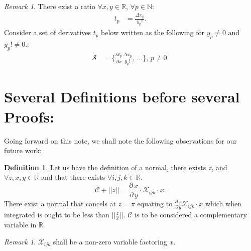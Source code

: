 \documentclass[10pt]{article}
\theoremstyle{plain}
\theoremstyle{definition}
\newtheorem{definition}[theorem]{Definition}
\theoremstyle{remark}
\newtheorem{remark}[theorem]{Remark}
\begin{document}
\begin{remark}
There exist a ratio $\forall x, y \in \mathbb{R}$, $\forall p \in \mathbb{N}$:
\begin{align*}
	t_p &= \frac{\Delta x_p}{y_p!}.
\end{align*}
Consider a set of derivatives $t_p$ below written as the following for $y_p \neq 0$ and $y_p! \neq 0$.:
\begin{align*}
	\mathcal{S} &= \{ \frac{\partial t_p}{\partial x} \frac{\Delta x_p}{y_p!}, \, \dots \}, \, p \neq 0.
\end{align*}
\end{remark}

\section{Several Definitions before several Proofs:}

Going forward on this note, we shall note the following observations for our future work:

\begin{definition}
	Let us have the definition of a normal, there exists $z$, and $\forall z, x, y \in \mathbb{R}$ and that there exists $\forall i, j, k \in \mathbb{R}$.
	\begin{equation}
		\mathcal{C} + ||z|| = \frac{\partial \, x}{\partial \, y} \cdot \mathcal{X}_{ijk} \cdot x.
	\end{equation}
	There exist a normal that cancels at $z=\pi$ equating to $\frac{\partial \, x}{\partial \, y} \mathcal{X}_{ijk} \cdot x$ which when integrated is ought to be less than $||\frac{z}{x}||$. $\mathcal{C}$ is to be considered a complementary variable in $\mathbb{R}$.
\end{definition}

\begin{remark}
	$\mathcal{X}_{ijk}$ shall be a non-zero variable factoring $x$.
\end{remark}
\end{document}
